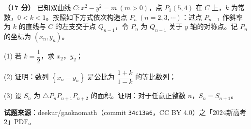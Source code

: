 \begin{question}
\textbf{（17 分）} 已知双曲线 $C:x^{2}-y^{2}=m\ (m>0)$，点 $P_1(5,4)$ 在 $C$ 上，$k$ 为常数，$0<k<1$。按照如下方式依次构造点 $P_n\ (n=2,3,\cdots)$：过点 $P_{n-1}$ 作斜率为 $k$ 的直线与 $C$ 的左支交于点 $Q_{n-1}$，令 $P_n$ 为 $Q_{n-1}$ 关于 $y$ 轴的对称点。记 $P_n$ 的坐标为 $\left(x_n,y_n\right)$。

  (1) 若 $k=\dfrac12$，求 $x_2$，$y_2$；

  (2) 证明：数列 $\left\{x_n-y_n\right\}$ 是公比为 $\dfrac{1+k}{1-k}$ 的等比数列；

  (3) 设 $S_n$ 为 $\triangle P_nP_{n+1}P_{n+2}$ 的面积。证明：对于任意正整数 $n$，$S_n=S_{n+1}$。

\par\medskip

\begin{gktip}
\textbf{试题来源}：deekur/gaokaomath（commit \texttt{34c13a6}，CC BY 4.0）之「2024新高考2」PDF。
\end{gktip}

\end{question}